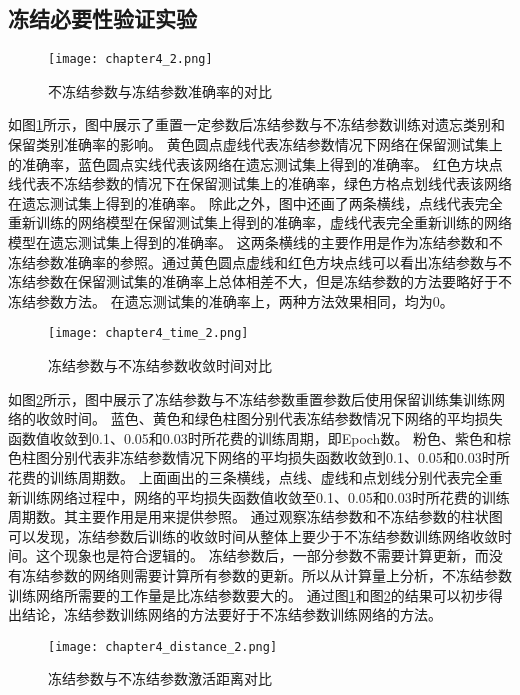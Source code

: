\subsection{冻结必要性验证实验}
\begin{figure}
    \centering
    \texttt{[image: chapter4\_2.png]}
    \caption{不冻结参数与冻结参数准确率的对比}
    \label{fig:chapter4_2}
\end{figure}

如图\ref{fig:chapter4_2}所示，图中展示了重置一定参数后冻结参数与不冻结参数训练对遗忘类别和保留类别准确率的影响。
黄色圆点虚线代表冻结参数情况下网络在保留测试集上的准确率，蓝色圆点实线代表该网络在遗忘测试集上得到的准确率。
红色方块点线代表不冻结参数的情况下在保留测试集上的准确率，绿色方格点划线代表该网络在遗忘测试集上得到的准确率。
除此之外，图中还画了两条横线，点线代表完全重新训练的网络模型在保留测试集上得到的准确率，虚线代表完全重新训练的网络模型在遗忘测试集上得到的准确率。
这两条横线的主要作用是作为冻结参数和不冻结参数准确率的参照。通过黄色圆点虚线和红色方块点线可以看出冻结参数与不冻结参数在保留测试集的准确率上总体相差不大，但是冻结参数的方法要略好于不冻结参数方法。
在遗忘测试集的准确率上，两种方法效果相同，均为0。
\begin{figure}
    \centering
    \texttt{[image: chapter4\_time\_2.png]}
    \caption{冻结参数与不冻结参数收敛时间对比}
    \label{fig:chapter4_time_2}
\end{figure}

如图\ref{fig:chapter4_time_2}所示，图中展示了冻结参数与不冻结参数重置参数后使用保留训练集训练网络的收敛时间。
蓝色、黄色和绿色柱图分别代表冻结参数情况下网络的平均损失函数值收敛到0.1、0.05和0.03时所花费的训练周期，即Epoch数。
粉色、紫色和棕色柱图分别代表非冻结参数情况下网络的平均损失函数收敛到0.1、0.05和0.03时所花费的训练周期数。
上面画出的三条横线，点线、虚线和点划线分别代表完全重新训练网络过程中，网络的平均损失函数值收敛至0.1、0.05和0.03时所花费的训练周期数。其主要作用是用来提供参照。
通过观察冻结参数和不冻结参数的柱状图可以发现，冻结参数后训练的收敛时间从整体上要少于不冻结参数训练网络收敛时间。这个现象也是符合逻辑的。
冻结参数后，一部分参数不需要计算更新，而没有冻结参数的网络则需要计算所有参数的更新。所以从计算量上分析，不冻结参数训练网络所需要的工作量是比冻结参数要大的。
通过图\ref{fig:chapter4_2}和图\ref{fig:chapter4_time_2}的结果可以初步得出结论，冻结参数训练网络的方法要好于不冻结参数训练网络的方法。
\begin{figure}
    \centering
    \texttt{[image: chapter4\_distance\_2.png]}
    \caption{冻结参数与不冻结参数激活距离对比}
    \label{fig:chapter4_distance_2}
\end{figure}


